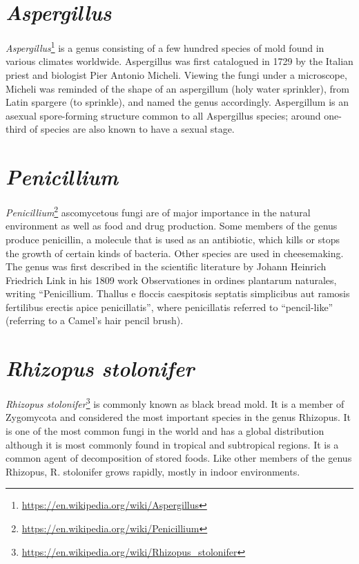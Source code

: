 \documentclass[]{book}
\let\rmarkdownfootnote\footnote%
\def\footnote{\protect\rmarkdownfootnote}
\renewcommand{\href}[2]{#2\footnote{\url{#1}}}
\theoremstyle{definition}
\theoremstyle{definition}
\theoremstyle{definition}
\theoremstyle{remark}
\begin{document}
\section{\texorpdfstring{\emph{Aspergillus}}{Aspergillus}}\label{aspergillus}

\href{https://en.wikipedia.org/wiki/Aspergillus}{\emph{Aspergillus}} is
a genus consisting of a few hundred species of mold found in various
climates worldwide. Aspergillus was first catalogued in 1729 by the
Italian priest and biologist Pier Antonio Micheli. Viewing the fungi
under a microscope, Micheli was reminded of the shape of an aspergillum
(holy water sprinkler), from Latin spargere (to sprinkle), and named the
genus accordingly. Aspergillum is an asexual spore-forming structure
common to all Aspergillus species; around one-third of species are also
known to have a sexual stage.

\section{\texorpdfstring{\emph{Penicillium}}{Penicillium}}\label{penicillium}

\href{https://en.wikipedia.org/wiki/Penicillium}{\emph{Penicillium}}
ascomycetous fungi are of major importance in the natural environment as
well as food and drug production. Some members of the genus produce
penicillin, a molecule that is used as an antibiotic, which kills or
stops the growth of certain kinds of bacteria. Other species are used in
cheesemaking. The genus was first described in the scientific literature
by Johann Heinrich Friedrich Link in his 1809 work Observationes in
ordines plantarum naturales, writing ``Penicillium. Thallus e floccis
caespitosis septatis simplicibus aut ramosis fertilibus erectis apice
penicillatis'', where penicillatis referred to ``pencil-like''
(referring to a Camel's hair pencil brush).

\section{\texorpdfstring{\emph{Rhizopus
stolonifer}}{Rhizopus stolonifer}}\label{rhizopus-stolonifer}

\href{https://en.wikipedia.org/wiki/Rhizopus_stolonifer}{\emph{Rhizopus
stolonifer}} is commonly known as black bread mold. It is a member of
Zygomycota and considered the most important species in the genus
Rhizopus. It is one of the most common fungi in the world and has a
global distribution although it is most commonly found in tropical and
subtropical regions. It is a common agent of decomposition of stored
foods. Like other members of the genus Rhizopus, R. stolonifer grows
rapidly, mostly in indoor environments.
\end{document}

